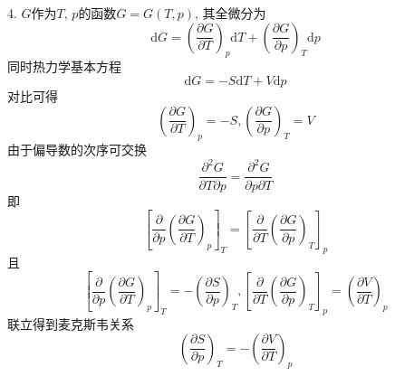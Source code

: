 4.
$G$作为$T$, $p$的函数$G=G(T,p)$, 其全微分为
\begin{equation}
    \mathrm{d}G=\left( \frac{\partial G}{\partial T} \right) _p \mathrm{d}T+\left( \frac{\partial G}{\partial p} \right) _T \mathrm{d}p
\end{equation}
同时热力学基本方程
\begin{equation}
    \mathrm{d}G=-S\mathrm{d}T+V\mathrm{d}p
\end{equation}
对比可得
\begin{equation}
    \left( \frac{\partial G}{\partial T} \right) _p=-S,\left( \frac{\partial G}{\partial p} \right) _T=V
\end{equation}
由于偏导数的次序可交换
\begin{equation}
    \frac{\partial ^2G}{\partial T\partial p}=\frac{\partial ^2G}{\partial p\partial T}
\end{equation}
即
\begin{equation}
    \left[ \frac{\partial}{\partial p}\left( \frac{\partial G}{\partial T} \right) _p \right] _T=\left[ \frac{\partial}{\partial T}\left( \frac{\partial G}{\partial p} \right) _T \right] _p
\end{equation}
且
\begin{equation}
    \left[ \frac{\partial}{\partial p}\left( \frac{\partial G}{\partial T} \right) _p \right] _T=-\left( \frac{\partial S}{\partial p} \right) _T,\left[ \frac{\partial}{\partial T}\left( \frac{\partial G}{\partial p} \right) _T \right] _p=\left( \frac{\partial V}{\partial T} \right) _p
\end{equation}
联立得到麦克斯韦关系
\begin{equation}
    \left( \frac{\partial S}{\partial p} \right) _T=-\left( \frac{\partial V}{\partial T} \right) _p
\end{equation}


\subsection{}










\subsection{}





















